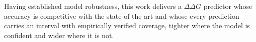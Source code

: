 \documentclass[11pt,a4paper]{article}
\begin{document}


Having established model robustness, 
this work delivers a $\Delta\Delta G$ predictor whose accuracy is competitive with the state of the art and whose every prediction carries an interval with empirically verified coverage, tighter where the model is confident and wider where it is not.
\end{document}
